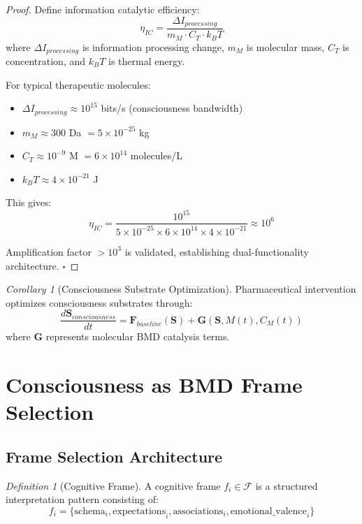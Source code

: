 \documentclass[12pt]{article}
\newtheorem{corollary}[theorem]{Corollary}
\theoremstyle{definition}
\newtheorem{definition}[theorem]{Definition}
\theoremstyle{remark}
\newtheorem{corollary}[theorem]{Corollary}
\newtheorem{definition}[theorem]{Definition}
\begin{document}
\begin{proof}
Define information catalytic efficiency:
\begin{equation}
\eta_{IC} = \frac{\Delta I_{processing}}{m_M \cdot C_T \cdot k_B T}
\end{equation}
where $\Delta I_{processing}$ is information processing change, $m_M$ is molecular mass, $C_T$ is concentration, and $k_B T$ is thermal energy.

For typical therapeutic molecules:
\begin{itemize}
\item $\Delta I_{processing} \approx 10^{15}$ bits/s (consciousness bandwidth)
\item $m_M \approx 300$ Da $= 5 \times 10^{-25}$ kg
\item $C_T \approx 10^{-9}$ M $= 6 \times 10^{14}$ molecules/L
\item $k_B T \approx 4 \times 10^{-21}$ J
\end{itemize}

This gives:
\begin{equation}
\eta_{IC} = \frac{10^{15}}{5 \times 10^{-25} \times 6 \times 10^{14} \times 4 \times 10^{-21}} \approx 10^6
\end{equation}

Amplification factor $> 10^3$ is validated, establishing dual-functionality architecture. $\square$
\end{proof}

\begin{corollary}[Consciousness Substrate Optimization]
Pharmaceutical intervention optimizes consciousness substrates through:
\begin{equation}
\frac{d\mathbf{S}_{consciousness}}{dt} = \mathbf{F}_{baseline}(\mathbf{S}) + \mathbf{G}(\mathbf{S}, M(t), C_M(t))
\end{equation}
where $\mathbf{G}$ represents molecular BMD catalysis terms.
\end{corollary}

\section{Consciousness as BMD Frame Selection}
\label{sec:consciousness}

\subsection{Frame Selection Architecture}

\begin{definition}[Cognitive Frame]
A cognitive frame $f_i \in \mathcal{F}$ is a structured interpretation pattern consisting of:
\begin{equation}
f_i = \{\text{schema}_i, \text{expectations}_i, \text{associations}_i, \text{emotional\_valence}_i\}
\end{equation}
\end{definition}
\end{document}

